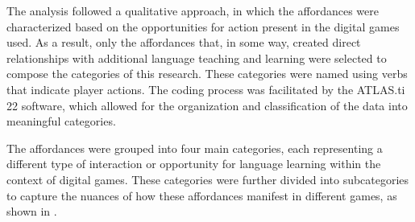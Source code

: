 \documentclass[english]{textolivre}
\begin{document}
The analysis followed a qualitative approach, in which the affordances were characterized based on the opportunities for action present in the digital games used. As a result, only the affordances that, in some way, created direct relationships with additional language teaching and learning were selected to compose the categories of this research. These categories were named using verbs that indicate player actions. The coding process was facilitated by the ATLAS.ti 22 software, which allowed for the organization and classification of the data into meaningful categories.

The affordances were grouped into four main categories, each representing a different type of interaction or opportunity for language learning within the context of digital games. These categories were further divided into subcategories to capture the nuances of how these affordances manifest in different games, as shown in .
\end{document}
